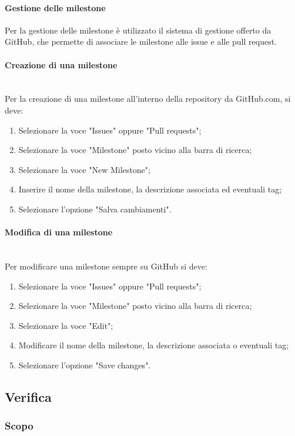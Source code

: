 {\paragraph{Gestione delle milestone}
Per la gestione delle {milestone} è utilizzato il sistema di gestione offerto da GitHub, che permette di associare le milestone alle issue e alle pull request.
\paragraph{Creazione di una milestone}\mbox{}\\
Per la creazione di una milestone all'interno della repository da GitHub.com, si deve:
\begin{enumerate}
\item Selezionare la voce "Issues" oppure "Pull requests";
\item Selezionare la voce "Milestone" posto vicino alla barra di ricerca;
\item Selezionare la voce "New Milestone";
\item Inserire il nome della milestone, la descrizione associata ed eventuali tag;
\item Selezionare l'opzione "Salva cambiamenti".
\end{enumerate}
\paragraph{Modifica di una milestone}\mbox{}\\
Per modificare una milestone sempre su GitHub si deve:
\begin{enumerate}
\item Selezionare la voce "Issues" oppure "Pull requests";
\item Selezionare la voce "Milestone" posto vicino alla barra di ricerca;
\item Selezionare la voce "Edit";
\item Modificare il nome della milestone, la descrizione associata o eventuali tag;
\item Selezionare l'opzione "Save changes".
\end{enumerate}

\subsection{Verifica}

\subsubsection{Scopo}

}
